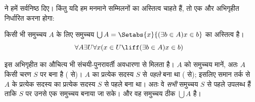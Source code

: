 \documentclass[../../../include/open-logic-section]{subfiles}
\begin{document}

 ने हमें सर्वनिष्ठ दिए। किंतु
यदि हम मनमाने सम्मिलनों का अस्तित्व चाहते हैं, तो एक और अभिगृहीत निर्धारित
करना होगा:

\begin{axiom}[सम्मिलन] किसी भी समुच्चय $A$ के लिए समुच्चय $\bigcup A =
\Setabs{x}{(\exists b \in A) x \in b}$ का अस्तित्व है।
\[
	\forall A \exists U \forall x(x \in U \liff (\exists b \in A)x \in b)
\]
\end{axiom}

इस अभिगृहीत का औचित्य भी संचयी-पुनरावर्ती अवधारणा से मिलता है। $A$ को
समुच्चय मानें, अतः $A$ किसी चरण $S$ पर बना है (\stageshier{} से)। $A$ का
प्रत्येक सदस्य $S$ से \emph{पहले} बना था (\stagesacc{} से); इसलिए समान
तर्क से $A$ के प्रत्येक सदस्य का प्रत्येक सदस्य $S$ से पहले बना था। अतः वे
\emph{सभी} समुच्चय $S$ से पहले उपलब्ध हैं ताकि $S$ पर उनसे एक समुच्चय बनाया
जा सके। और वह समुच्चय ठीक $\bigcup A$ है।
\end{document}
